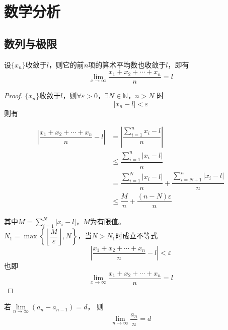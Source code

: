 \chapter{数学分析}

\section{数列与极限}

\begin{proposition}[Cauthy命题]

    设$\{x_n\}$收敛于$l$，则它的前$n$项的算术平均数也收敛于$l$，即有
    $$\lim\limits_{x \to \infty}{\dfrac{x_1 + x_2 + \cdots + x_n}{n}} = l$$

\end{proposition}

\begin{proof}

    $\{x_n\}$收敛于$l$，则$\forall \varepsilon > 0$，$\exists N \in \mathbb{N}$，$n > N$ 时
    $$|x_n - l| < \varepsilon$$
    则有

    \begin{align*}
        \left| \dfrac{x_1 + x_2 + \cdots + x_n}{n} - l \right| & = \left| \dfrac{\sum\limits_{i = 1}^{n}{x_i - l}}{n} \right| \\
        & \leq \dfrac{\sum\limits_{i = 1}^{n}{|x_i - l|}}{n} \\
        & = \dfrac{\sum\limits_{i = 1}^{N}{|x_i - l|}}{n} + \dfrac{\sum\limits_{i = N + 1}^{n}{|x_i - l|}}{n} \\
        & \leq \dfrac{M}{n} + \dfrac{(n - N)\varepsilon}{n}
    \end{align*}

    其中$M = \sum\limits_{i = 1}^{N}{|x_i - l|}$，$M$为有限值。\\
    $N_1 = \max\left\{ \left\lfloor \dfrac{M}{\varepsilon} \right\rfloor, N \right\}$，当$N > N_1$时成立不等式
    $$\left| \dfrac{x_1 + x_2 + \cdots + x_n}{n} - l \right| < \varepsilon$$
    也即
    $$\lim\limits_{x \to \infty}{\dfrac{x_1 + x_2 + \cdots + x_n}{n}} = l$$

\end{proof}

\begin{corollary}[Cauthy命题推论]

    若$\lim\limits_{n \to \infty}{(a_n - a_{n - 1})} = d$，
    则
    $$\lim\limits_{n \to \infty}{\dfrac{a_n}{n}} = d$$

\end{corollary}

